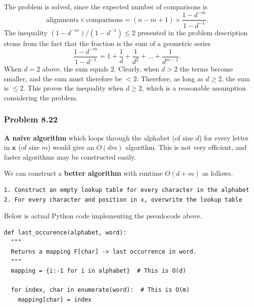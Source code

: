 \documentclass[12pt, a4paper]{article}
\newcommand{\vect}[1]{\bm{#1}}
\begin{document}
{\begin{equation*}
\end{equation*}
The problem is solved, since the expected number of comparisons is 
\begin{equation*}
	\text{alignments} \times \text{comparisons} = (n - m + 1) \times \frac{1 - d^{-m}}{1 - d^{-1}} .
\end{equation*}
The inequality $(1 - d^{-m})/(1 - d^{-1}) \leq 2$ presented in the problem description stems from the fact that the fraction is the sum of a geometric series
\begin{equation*}
	\frac{1 - d^{-m}}{1 - d^{-1}} = 1 + \frac{1}{d} + \frac{1}{d^2}  + \dots + \frac{1}{d^{m-1}}.
\end{equation*}
When $d=2$ above, the sum equals $2$. 
Clearly, when $d > 2$ the terms become smaller, and the sum must therefore be $< 2$.
Therefore, as long as $d \geq 2$, the sum is $\leq 2$.
This proves the inequality when $d \geq 2$, which is a reasonable assumption considering the problem.


\subsubsection*{Problem 8.22}
\textbf{A naive algorithm} which loops through the alphabet (of size $d$) for every letter in $\vect{x}$ (of size $m$) would give an $O(dm)$ algorithm.
This is not very efficient, and faster algorithms may be constructed easily.

We can construct a \textbf{better algorithm} with runtime $O(d + m)$ as follows.
\begin{verbatim}
1. Construct an empty lookup table for every character in the alphabet
2. For every character and position in x, overwrite the lookup table
\end{verbatim}
Below is actual Python code implementing the pseudocode above.
\begin{Verbatim}
def last_occurence(alphabet, word):
  """
  Returns a mapping F[char] -> last occurrence in word.
  """
  mapping = {i:-1 for i in alphabet}  # This is O(d)

  for index, char in enumerate(word):  # This is O(m)
    mapping[char] = index


\end{Verbatim}}
\end{document}
